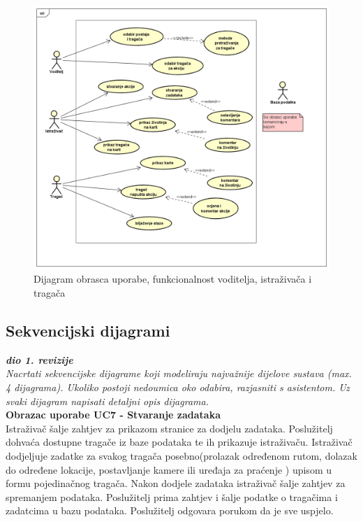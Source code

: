 				\begin{figure}[H]
					\includegraphics[scale=0.5]{slike/dijagram2.PNG} %
					\centering
					\caption{Dijagram obrasca uporabe, funkcionalnost voditelja, istraživača i tragača}
					\label{fig:dijagram2} %
				\end{figure}
				
			\subsection{Sekvencijski dijagrami}
				
				\textbf{\textit{dio 1. revizije}}\\
				
				\textit{Nacrtati sekvencijske dijagrame koji modeliraju najvažnije dijelove sustava (max. 4 dijagrama). Ukoliko postoji nedoumica oko odabira, razjasniti s asistentom. Uz svaki dijagram napisati detaljni opis dijagrama.}\\
				
				\noindent \textbf{Obrazac uporabe UC7 - Stvaranje zadataka}\\
				
				\noindent Istraživač šalje zahtjev za prikazom stranice za dodjelu zadataka. Poslužitelj dohvaća dostupne tragače iz baze podataka te ih prikazuje istraživaču. Istraživač dodjeljuje zadatke za svakog tragača posebno(prolazak određenom rutom, dolazak do određene lokacije, postavljanje kamere ili uređaja za praćenje
				) upisom u formu pojedinačnog tragača. Nakon dodjele zadataka istraživač šalje zahtjev za spremanjem podataka. Poslužitelj prima zahtjev i šalje podatke o tragačima i zadatcima u bazu podataka. Poslužitelj odgovara porukom da je sve uspjelo.
				
